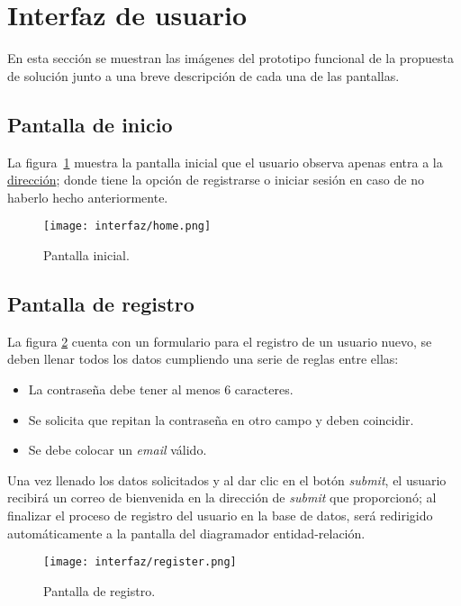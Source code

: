 \section{Interfaz de usuario}

En esta sección se muestran las imágenes del prototipo funcional de la propuesta de solución junto a una breve descripción de cada una de las pantallas.

\subsection*{Pantalla de inicio}

La figura~\ref{img:app_home} muestra la pantalla inicial que el usuario observa apenas entra a la \href{https://serene-haibt-2239b4.netlify.app/}{dirección}; donde tiene la opción de registrarse o iniciar sesión en caso de no haberlo hecho anteriormente.

\begin{figure}[H]
    \centering
    \texttt{[image: interfaz/home.png]}
    \caption{Pantalla inicial.}
    \label{img:app_home}
\end{figure}

\subsection*{Pantalla de registro}

La figura \ref{img:app_register} cuenta con un formulario para el registro de un usuario nuevo, se deben llenar todos los datos cumpliendo una serie de reglas entre ellas:

\begin{itemize}
    \item La contraseña debe tener al menos 6 caracteres.
    \item Se solicita que repitan la contraseña en otro campo y deben coincidir.
    \item Se debe colocar un \textit{email} válido.
\end{itemize}

Una vez llenado los datos solicitados y al dar clic en el botón \textit{submit}, el usuario recibirá un correo de bienvenida en la dirección de \textit{submit} que proporcionó; al finalizar el proceso de registro del usuario en la base de datos, será redirigido automáticamente a la pantalla del diagramador entidad-relación.

\begin{figure}[H]
    \centering
    \texttt{[image: interfaz/register.png]}
    \caption{Pantalla de registro.}
    \label{img:app_register}
\end{figure}

